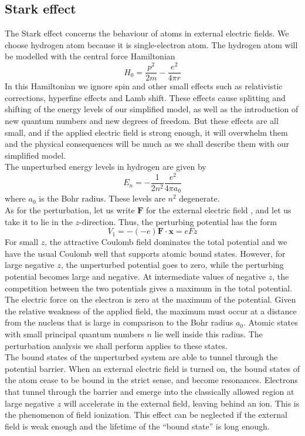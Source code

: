 \subsection{Stark effect}
The Stark effect concerns the behaviour of atoms in external electric fields. We choose hydrogen atom because it is single-electron atom.
The hydrogen atom will be modelled with the central force Hamiltonian
\[H_0 = \frac{p^2}{2m} - \frac{e^2}{4\pi r}\]
In this Hamiltonian we ignore spin and other small effects such as relativistic corrections, hyperfine effects and Lamb shift. These effects cause splitting and shifting of the energy levels of our simplified model, as well as the introduction of new quantum numbers and new degrees of freedom.
But these effects are all small, and if the applied electric field is strong enough, it will overwhelm them and the physical consequences will be much as we shall describe them with our simplified model. \\
The unperturbed energy levels in hydrogen are given by
\[E_n = -\frac{1}{2n^2} \frac{e^2}{4\pi a_0}\]
where $a_0$ is the Bohr radius. These levels are $n^2$ degenerate.\\
As for the perturbation, let us write $\bm{F}$ for the external electric field , and let us take it to lie in the $z$-direction. Thus, the perturbing potential has the form
\[V_1 = -(-e)\bm{F}\cdot\bm{x} = eFz\]
For small $z$, the attractive Coulomb field dominates the total potential and we have the usual Coulomb well that supports atomic bound states. However, for large negative $z$, the unperturbed potential goes to zero, while the perturbing
potential becomes large and negative. At intermediate values of negative $z$, the competition between the two potentials gives a maximum in the total potential. The electric force on the electron is zero at the maximum of the potential. 
Given the relative weakness of the applied field, the maximum must occur at a distance from the nucleus that is large in comparison to the Bohr radius $a_0$. Atomic states with small principal quantum numbers $n$ lie well inside this radius. The perturbation analysis we shall perform applies to these states.\\
The bound states of the unperturbed system are able to tunnel through the potential barrier. When an external electric field is turned on, the bound states of the atom cease to be bound in the strict sense, and become resonances. 
Electrons that tunnel through the barrier and emerge into the classically allowed region at large negative $z$ will accelerate in the external field, leaving behind an ion. This is the phenomenon of field ionization. This effect can be neglected if the external field is weak enough and the lifetime of the ``bound state'' is long enough.\\ \\
